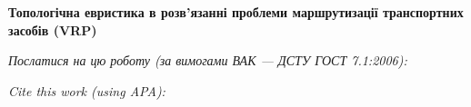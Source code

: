 \documentclass[a4paper,14pt,article]{memoir}
\newcommand{\articleTitleUkr}{
	Топологічна евристика в розв’язанні проблеми маршрутизації транспортних засобів (VRP)}
\begin{document}
	
	\begin{center}
		\par\textbf{\MakeUppercase\articleTitleUkr}
		\par\textbf{\authorFullNameUkr}
	\end{center}
	
	\par\bigskip\textit{Послатися на цю роботу (за вимогами ВАК --- ДСТУ ГОСТ 7.1:2006):}
	\par{}
	\par\bigskip\textit{Cite this work (using APA):}
	\par{}
	
	
\end{document}
